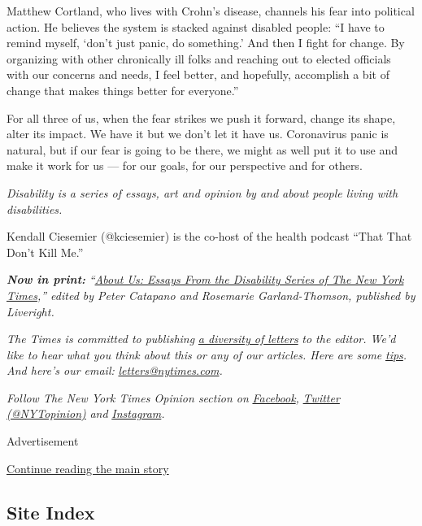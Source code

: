 Matthew Cortland, who lives with Crohn's disease, channels his fear into
political action. He believes the system is stacked against disabled
people: ``I have to remind myself, `don't just panic, do something.' And
then I fight for change. By organizing with other chronically ill folks
and reaching out to elected officials with our concerns and needs, I
feel better, and hopefully, accomplish a bit of change that makes things
better for everyone.''

For all three of us, when the fear strikes we push it forward, change
its shape, alter its impact. We have it but we don't let it have us.
Coronavirus panic is natural, but if our fear is going to be there, we
might as well put it to use and make it work for us --- for our goals,
for our perspective and for others.

\emph{Disability is a series of essays, art and opinion by and about
people living with disabilities.}

Kendall Ciesemier (@kciesemier) is the co-host of the health podcast
``That That Don't Kill Me.''

\emph{\textbf{Now in print:}}
\emph{``}\href{https://www.aboutusbook.com/}{\emph{About Us: Essays From
the Disability Series of The New York Times}}\emph{,'' edited by Peter
Catapano and Rosemarie Garland-Thomson, published by Liveright.}

\emph{The Times is committed to publishing}
\href{https://www.nytimes.com/2019/01/31/opinion/letters/letters-to-editor-new-york-times-women.html}{\emph{a
diversity of letters}} \emph{to the editor. We'd like to hear what you
think about this or any of our articles. Here are some}
\href{https://help.nytimes.com/hc/en-us/articles/115014925288-How-to-submit-a-letter-to-the-editor}{\emph{tips}}\emph{.
And here's our email:}
\href{mailto:letters@nytimes.com}{\emph{letters@nytimes.com}}\emph{.}

\emph{Follow The New York Times Opinion section on}
\href{https://www.facebook.com/nytopinion}{\emph{Facebook}}\emph{,}
\href{http://twitter.com/NYTOpinion}{\emph{Twitter (@NYTopinion)}}
\emph{and}
\href{https://www.instagram.com/nytopinion/}{\emph{Instagram}}\emph{.}

Advertisement

\protect\hyperlink{after-bottom}{Continue reading the main story}

\hypertarget{site-index}{%
\subsection{Site Index}\label{site-index}}

